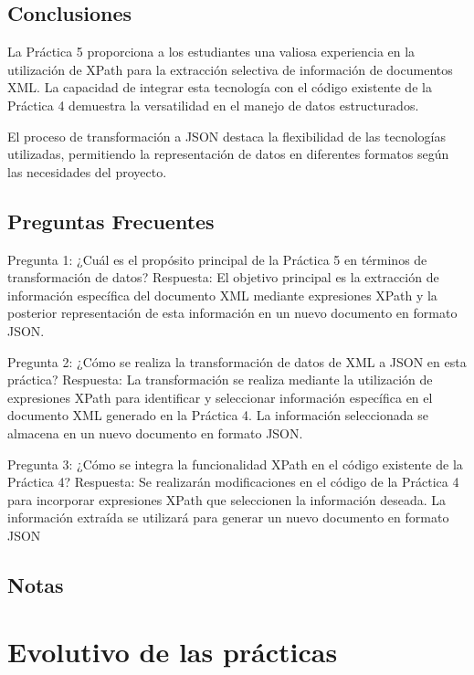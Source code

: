 \subsection{Conclusiones}

\noindent La Práctica 5 proporciona a los estudiantes una valiosa experiencia en la utilización de XPath para la extracción selectiva de información de documentos XML. La capacidad de integrar esta tecnología con el código existente de la Práctica 4 demuestra la versatilidad en el manejo de datos estructurados.

El proceso de transformación a JSON destaca la flexibilidad de las tecnologías utilizadas, permitiendo la representación de datos en diferentes formatos según las necesidades del proyecto.

\subsection{Preguntas Frecuentes}

\noindent Pregunta 1: ¿Cuál es el propósito principal de la Práctica 5 en términos de transformación de datos?
Respuesta: El objetivo principal es la extracción de información específica del documento XML mediante expresiones XPath y la posterior representación de esta información en un nuevo documento en formato JSON.

Pregunta 2: ¿Cómo se realiza la transformación de datos de XML a JSON en esta práctica?
Respuesta: La transformación se realiza mediante la utilización de expresiones XPath para identificar y seleccionar información específica en el documento XML generado en la Práctica 4. La información seleccionada se almacena en un nuevo documento en formato JSON.

Pregunta 3: ¿Cómo se integra la funcionalidad XPath en el código existente de la Práctica 4?
Respuesta: Se realizarán modificaciones en el código de la Práctica 4 para incorporar expresiones XPath que seleccionen la información deseada. La información extraída se utilizará para generar un nuevo documento en formato JSON

\subsection{Notas}

\section{Evolutivo de las prácticas}

